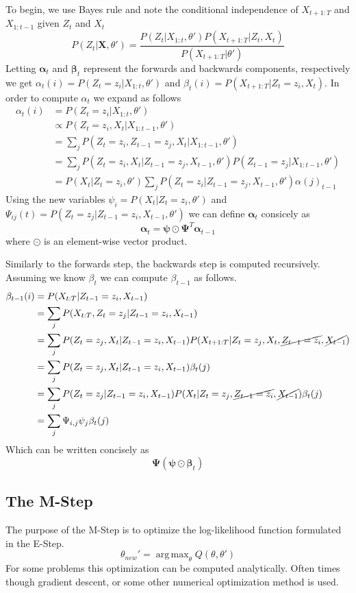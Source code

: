 \documentclass{amsart}
\theoremstyle{definition}
\theoremstyle{remark}
\numberwithin{equation}{section}
\DeclareMathOperator*{\argmax}{arg\,max}
\begin{document}
To begin, we use Bayes rule and note the conditional independence of $X_{t+1:T}$ and $X_{1:t-1}$ given $Z_t$ and $X_t$
\[
P(Z_t|\textbf{X},\theta') = \frac{P(Z_t|X_{1:t},\theta')P(X_{t+1:T}|Z_t,X_t)}{P(X_{t+1:T}|\theta')}
\]
Letting $\boldsymbol\alpha_t$ and $\boldsymbol\beta_t$ represent the forwards and backwards components, respectively we get $\alpha_t(i) = P(Z_t=z_i|X_{1:t},\theta')$ and $\beta_t(i) = P(X_{t+1:T}|Z_t=z_i,X_t)$. In order to compute $\alpha_t$ we expand as follows
\begin{align*}
\alpha_t(i) &= P(Z_t=z_i|X_{1:t}, \theta')\\
&\propto P(Z_t = z_i, X_t | X_{1:t-1}, \theta')\\
&= \sum_j P(Z_t = z_i, Z_{t-1} = z_j, X_t | X_{1:t-1},\theta')\\
&= \sum_j P(Z_t = z_i, X_t | Z_{t-1} = z_j, X_{t-1}, \theta')P(Z_{t-1} = z_j| X_{1:t-1}, \theta')\\
&= P(X_t | Z_t = z_i, \theta') \sum_j P(Z_t = z_i | Z_{t-1} = z_j, X_{t-1}, \theta')\alpha(j)_{t-1}
\end{align*}
Using the new variables $\psi_i = P(X_t | Z_t = z_i, \theta')$ and $\Psi_{ij}(t) = P(Z_t = z_j | Z_{t-1} = z_i, X_{t-1}, \theta')$ we can define $\boldsymbol\alpha_t$ consicely as
\[
\boldsymbol\alpha_t = \boldsymbol\psi \odot \boldsymbol\Psi^T \boldsymbol\alpha_{t-1}
\]
where $\odot$ is an element-wise vector product.

Similarly to the forwards step, the backwards step is computed recursively. Assuming we know $\beta_t$ we can compute $\beta_{t-1}$ as follows.
\begin{align*}
\beta_{t-1}(i) &= P(X_{t:T}|Z_{t-1} = z_i, X_{t-1})\\
&= \sum_j P(X_{t:T}, Z_t = z_j|Z_{t-1} = z_i, X_{t-1})\\
&= \sum_j P(Z_t = z_j, X_t|Z_{t-1} = z_i, X_{t-1})P(X_{t+1:T}| Z_t = z_j, X_{t}, \cancel{Z_{t-1} = z_i}, \cancel{X_{t-1}})\\
&= \sum_j P(Z_t = z_j, X_t|Z_{t-1} = z_i, X_{t-1})\beta_t(j)\\
&= \sum_j P(Z_t = z_j|Z_{t-1} = z_i, X_{t-1}) P(X_t | Z_t = z_j, \cancel{Z_{t-1} = z_i}, \cancel{X_{t-1}})\beta_t(j)\\
&= \sum_j \Psi_{i,j}\psi_j\beta_t(j)
\end{align*}
Which can be written concisely as 
\[
\boldsymbol\Psi(\boldsymbol\psi \odot \boldsymbol\beta_t)
\]

\subsection*{The M-Step}
The purpose of the M-Step is to optimize the log-likelihood function formulated in the E-Step.
\[
\theta_{new}' = \argmax_\theta Q(\theta,\theta')
\]
For some problems this optimization can be computed analytically. Often times though gradient descent, or some other numerical optimization method is used.
\end{document}
